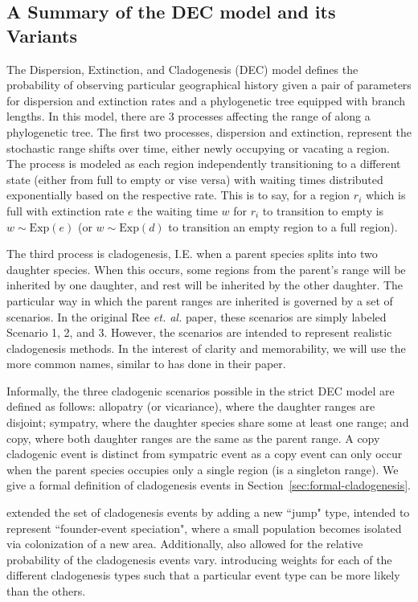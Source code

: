\documentclass[a4paper]{article}
\begin{document}
\subsection{A Summary of the DEC model and its Variants} \label{sec:model}

The Dispersion, Extinction, and Cladogenesis (DEC) model defines the probability of observing particular geographical
history given a pair of parameters for dispersion and extinction rates and a phylogenetic tree equipped with branch
lengths. 
In this model, there are 3 processes affecting the range of along a phylogenetic tree.
The first two processes, dispersion and extinction, represent the stochastic range shifts over time, either newly
occupying or vacating a region.
The process is modeled as each region independently transitioning to a different state (either from full to empty or
vise versa) with waiting times distributed exponentially based on the respective rate.
This is to say, for a region \( r_i \) which is full with extinction rate \( e \) the waiting time \( w \) for \( r_i \)
to transition to empty is \( w \sim \text{Exp}(e) \) (or $w \sim \text{Exp}(d)$ to transition an empty region to a full
region).

The third process is cladogenesis, I.E. when a parent species splits into two daughter species.
When this occurs, some regions from the parent's range will be inherited by one daughter, and rest will be inherited by
the other daughter.
The particular way in which the parent ranges are inherited is governed by a set of scenarios.
In the original Ree \textit{et. al.}\cite{ALikelihoodFrReeR2005} paper, these scenarios are simply labeled Scenario 1,
2, and 3.
However, the scenarios are intended to represent realistic cladogenesis methods.
In the interest of clarity and memorability, we will use the more common names, similar to
\citet{ModelSelectionMatzke2014} has done in their paper.

Informally, the three cladogenic scenarios possible in the strict DEC model are defined as follows: allopatry (or
vicariance), where the daughter ranges are disjoint; sympatry, where the daughter species share some at least one range;
and copy, where both daughter ranges are the same as the parent range.
A copy cladogenic event is distinct from sympatric event as a copy event can only occur when the parent species occupies
only a single region (is a singleton range).
We give a formal definition of cladogenesis events in Section~\ref{sec:formal-cladogenesis}.

\citet{ModelSelectionMatzke2014} extended the set of cladogenesis events by adding a new ``jump" type, intended to
represent ``founder-event speciation", where a small population becomes isolated via colonization of a new area.
Additionally, \citet{ModelSelectionMatzke2014} also allowed for the relative probability of the cladogenesis events
vary.
introducing weights for each of the different cladogenesis types such that a particular event type can be more likely
than the others.
\end{document}
